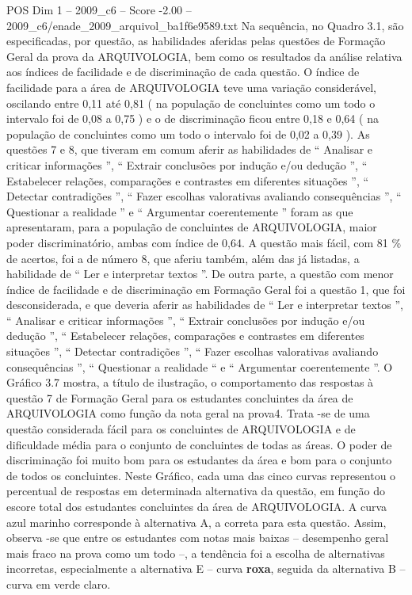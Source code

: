 \begin{textsample}{POS Dim 1 – 2009\_c6 – Score -2.00 – 2009\_c6/enade\_2009\_arquivol\_ba1f6e9589.txt}
Na sequência, no Quadro 3.1, são especificadas, por questão, as habilidades aferidas pelas questões de Formação Geral da prova da ARQUIVOLOGIA, bem como os resultados da análise relativa aos índices de facilidade e de discriminação de cada questão.
O índice de facilidade para a área de ARQUIVOLOGIA teve uma variação considerável, oscilando entre 0,11 até 0,81 ( na população de concluintes como um todo o intervalo foi de 0,08 a 0,75 ) e o de discriminação ficou entre 0,18 e 0,64 ( na população de concluintes como um todo o intervalo foi de 0,02 a 0,39 ).
As questões 7 e 8, que tiveram em comum aferir as habilidades de “ Analisar e criticar informações ”, “ Extrair conclusões por indução e/ou dedução ”, “ Estabelecer relações, comparações e contrastes em diferentes situações ”, “ Detectar contradições ”, “ Fazer escolhas valorativas avaliando consequências ”, “ Questionar a realidade ” e “ Argumentar coerentemente ” foram as que apresentaram, para a população de concluintes de ARQUIVOLOGIA, maior poder discriminatório, ambas com índice de 0,64.
A questão mais fácil, com 81 \% de acertos, foi a de número 8, que aferiu também, além das já listadas, a habilidade de “ Ler e interpretar textos ”.
De outra parte, a questão com menor índice de facilidade e de discriminação em Formação Geral foi a questão 1, que foi desconsiderada, e que deveria aferir as habilidades de “ Ler e interpretar textos ”, “ Analisar e criticar informações ”, “ Extrair conclusões por indução e/ou dedução ”, “ Estabelecer relações, comparações e contrastes em diferentes situações ”, “ Detectar contradições ”, “ Fazer escolhas valorativas avaliando consequências ”, “ Questionar a realidade “ e “ Argumentar coerentemente ”.
O Gráfico 3.7 mostra, a título de ilustração, o comportamento das respostas à questão 7 de Formação Geral para os estudantes concluintes da área de ARQUIVOLOGIA como função da nota geral na prova4.
Trata -se de uma questão considerada fácil para os concluintes de ARQUIVOLOGIA e de dificuldade média para o conjunto de concluintes de todas as áreas.
O poder de discriminação foi muito bom para os estudantes da área e bom para o conjunto de todos os concluintes.
Neste Gráfico, cada uma das cinco curvas representou o percentual de respostas em determinada alternativa da questão, em função do escore total dos estudantes concluintes da área de ARQUIVOLOGIA.
A curva azul marinho corresponde à alternativa A, a correta para esta questão.
Assim, observa -se que entre os estudantes com notas mais baixas – desempenho geral mais fraco na prova como um todo –, a tendência foi a escolha de alternativas incorretas, especialmente a alternativa E – curva \textbf{roxa}, seguida da alternativa B – curva em verde claro.

\end{textsample}
